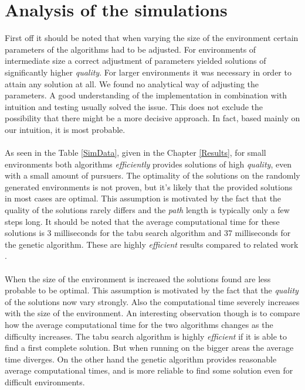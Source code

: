 \section{Analysis of the simulations}
First off it should be noted that when varying the size of the environment certain parameters of the algorithms had to be adjusted. For environments of intermediate size a correct adjustment of parameters yielded solutions of significantly higher \emph{quality}. For larger environments it was necessary in order to attain any solution at all. We found no analytical way of adjusting the parameters. A good understanding of the implementation in combination with intuition and testing usually solved the issue. This does not exclude the possibility that there might be a more decisive approach. In fact, based mainly on our intuition, it is most probable.\\
\\As seen in the Table \ref{SimData}, given in the Chapter \ref{Results}, for small environments both algorithms \emph{efficiently} provides solutions of high \emph{quality}, even with a small amount of pursuers. The optimality of the solutions on the randomly generated environments is not proven, but it's likely that the provided solutions in most cases are optimal. This assumption is motivated by the fact that the quality of the solutions rarely differs and the \emph{path} length is typically only a few steps long. It should be noted that the average computational time for these solutions is 3 milliseconds for the tabu search algorithm and 37 milliseconds for the genetic algorithm. These are highly \emph{efficient} results compared to related work \cite{paper1}.\\%
\\When the size of the environment is increased the solutions found are less probable to be optimal. This assumption is motivated by the fact that the \emph{quality} of the solutions now vary strongly. Also the computational time severely increases with the size of the environment. An interesting observation though is to compare how the average computational time for the two algorithms changes as the difficulty increases. The tabu search algorithm is highly \emph{efficient} if it is able to find a first complete solution. But when running on the bigger areas the average time diverges. On the other hand the genetic algorithm provides reasonable average computational times, and is more reliable to find some solution even for difficult environments.\\
